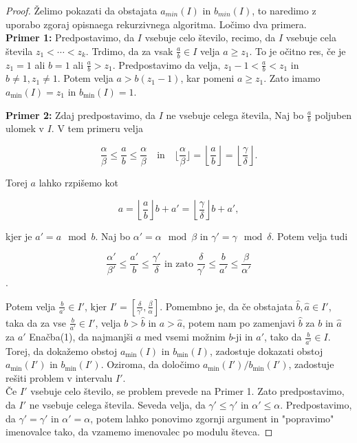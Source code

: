 \documentclass[a4paper,14pt]{article}
\theoremstyle{definition} %
\theoremstyle{plain} %
\begin{document}
\begin{proof}
    Želimo pokazati da obstajata $a_{min}(I)$ in $b_{min}(I)$, to naredimo z uporabo zgoraj opisnaega rekurzivnega algoritma. 
    Ločimo dva primera.\\
    \textbf{Primer 1:} Predpostavimo, da $I$ vsebuje celo število, 
    recimo, da $I$ vsebuje cela števila $z_1 < \cdots < z_k$. Trdimo, da za vsak $\frac{a}{b} \in I$ velja $a \geq z_1$. 
    To je očitno res, če je $z_1 = 1$ ali $b = 1$ ali $\frac{a}{b} > z_1$. Predpostavimo da velja, $z_1 - 1 < \frac{a}{b} < z_1$ in $ b \neq 1, z_1 \neq 1$. 
    Potem velja $a > b (z_1 - 1)$, kar pomeni $a \geq z_1$. Zato imamo $a_{\min}(I) = z_1$ in $b_{\min}(I) = 1$.


    
\textbf{Primer 2:} Zdaj predpostavimo, da $I$ ne vsebuje celega števila, 
Naj bo $\frac{a}{b}$ poljuben ulomek v $I$. V tem primeru velja

$$
\frac{\alpha}{\beta} \leq \frac{a}{b} \leq \frac{\alpha}{\beta} \quad \text{in} \quad \lfloor\frac{\alpha}{\beta}\rfloor = \left\lfloor \frac{a}{b} \right\rfloor = \left\lfloor \frac{\gamma}{\delta} \right\rfloor.
$$

Torej $a$ lahko rzpišemo kot


$$ a = \left\lfloor \frac{a}{b} \right\rfloor b + a' = \left\lfloor \frac{\gamma}{\delta} \right\rfloor b + a',$$

kjer je $a' = a \mod b$. 
Naj bo $\alpha' = \alpha \mod \beta$ in $\gamma' = \gamma \mod \delta$. Potem velja tudi

$$\frac{\alpha'}{\beta'} \leq \frac{a'}{b} \leq \frac{\gamma'}{\delta} \text{  in zato  } \frac{\delta}{\gamma'} \leq \frac{b}{a'} \leq \frac{\beta}{\alpha'}$$. 

Potem velja $\frac{b}{a'} \in I'$, kjer $I' = \left[\frac{\delta}{\gamma'}, \frac{\beta}{\alpha}\right]$. 
Pomembno je, da če obstajata $\hat{b}, \hat{a} \in I'$, taka da za vse $\frac{b}{a'} \in I'$, velja $b > \hat{b}$ in $a > \hat{a}$, 
potem nam po zamenjavi $\hat{b}$ za $b$ in $\hat{a}$ za $a'$ 
Enačba(1), da najmanjši $a$ med vsemi možnim $b$-ji in $a'$, tako da $\frac{b}{a'} \in I$. \\


Torej, da dokažemo obstoj $a_{\min}(I)$ in $b_{\min}(I)$, zadostuje dokazati obstoj $a_{\min}(I')$ in $b_{\min}(I')$. 
Oziroma, da določimo $a_{\min}(I')/b_{\min}(I')$, zadostuje rešiti problem v intervalu $I'$.\\

Če $I'$ vsebuje celo število, se problem prevede na Primer 1. 
Zato predpostavimo, da $I'$ ne vsebuje celega števila. 
Seveda velja, da $\gamma' \leq \gamma'$ in $\alpha' \leq \alpha$.
Predpostavimo, da $\gamma' = \gamma' $ in $\alpha' = \alpha$, potem lahko ponovimo zgornji argument in "popravimo" imenovalce tako, da vzamemo imenovalec po modulu števca.



\end{proof}
\end{document}
